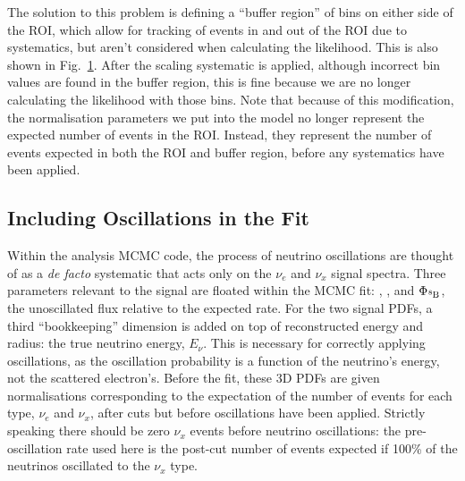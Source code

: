 \begin{figure}
    \centering
    \caption[]{}
    \label{fig:energy_scaling_example}
\end{figure}

The solution to this problem is defining a ``buffer region'' of bins on either side of the ROI, which allow for tracking of events in and out of the ROI due to systematics, but aren't considered when calculating the likelihood. This is also shown in Fig.~\ref{fig:energy_scaling_example}. After the scaling systematic is applied, although incorrect bin values are found in the buffer region, this is fine because we are no longer calculating the likelihood with those bins. Note that because of this modification, the normalisation parameters we put into the model no longer represent the expected number of events in the ROI. Instead, they represent the number of events expected in both the ROI and buffer region, before any systematics have been applied.


\subsection{Including Oscillations in the Fit}\label{sec:osc_in_fit}
Within the analysis MCMC code, the process of neutrino oscillations are thought of as a \textit{de facto} systematic that acts only on the \beight{} $\nu_{e}$ and $\nu_{x}$ signal spectra. Three parameters relevant to the signal are floated within the MCMC fit: \dmsq{}, \tonetwo{}, and $\Phi_{\ce{^{8}B}}$, the unoscillated  flux relative to the expected rate. For the two signal PDFs, a third ``bookkeeping'' dimension is added on top of reconstructed energy and radius: the true neutrino energy, $E_{\nu}$. This is necessary for correctly applying oscillations, as the oscillation probability is a function of the neutrino's energy, not the scattered electron's. Before the fit, these 3D PDFs are given normalisations corresponding to the expectation of the number of events for each type, $\nu_{e}$ and $\nu_{x}$, after cuts but before oscillations have been applied. Strictly speaking there should be zero $\nu_{x}$ events before neutrino oscillations: the pre-oscillation rate used here is the post-cut number of events expected if 100\% of the neutrinos oscillated to the $\nu_{x}$ type.

